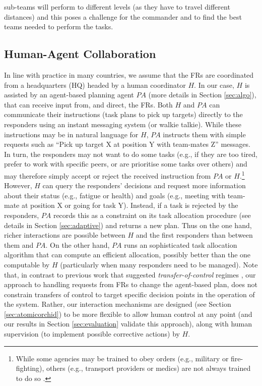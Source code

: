 sub-teams will perform to different levels (as they have to travel different distances) and this poses a challenge for the commander and to find the best teams needed to perform the tasks.
%
\subsection{Human-Agent Collaboration}
\noindent In line with practice in many countries, we assume that the FRs are coordinated from a headquarters (HQ) headed by a human coordinator $H$. In our case, $H$ is assisted by an agent-based planning agent $PA$ (more details in Section \ref{sec:algo}), that can receive input from, and direct, the FRs.   Both  $H$ and $PA$  can communicate their  instructions (task plans to pick up targets) directly to the responders using an instant messaging system (or walkie talkie).  While these instructions may be in natural language for $H$, $PA$ instructs them with simple requests such as ``Pick up target X at position Y with team-mates Z'' messages. In turn, the responders may not want to do some tasks (e.g., if they are too tired, prefer to work with specific  peers, or are prioritise some tasks over others) and may therefore simply accept or reject the received instruction from $PA$ or $H$.\footnote{While some agencies may be trained to obey orders (e.g., military or fire-fighting), others (e.g., transport providers or medics) are not  always trained to do so \cite{harvard2010disaster}.} However, $H$ can query the responders' decisions and request  more information about their status (e.g., fatigue or health) and goals (e.g., meeting with team-mate at position X or going for task Y). Instead, if a task is rejected by the responders, $PA$ records this as a constraint on its task allocation procedure (see details in Section \ref{sec:adaptive}) and returns a new plan. Thus on the one hand, richer interactions are possible between $H$ and the first responders than between them and $PA$. On the other hand, $PA$ runs an sophisticated task allocation algorithm that can compute an efficient allocation, possibly better than the one computable by $H$ (particularly when many responders need to be managed). Note that, in contrast to previous work that suggested \emph{transfer-of-control} regimes \cite{scerri:etal:2005}, our approach to handling requests from FRs to change the agent-based plan, does not constrain transfers of control to target specific decision points in the operation of the system. Rather, our interaction mechanisms are designed (see Section \ref{sec:atomicorchid}) to be more flexible to allow human control at any point (and our results  in Section \ref{sec:evaluation} validate this approach), along with human supervision (to implement possible corrective actions) by $H$.


